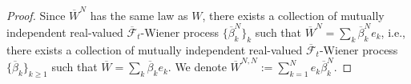 \documentclass[reqno]{amsart}
\theoremstyle{definition}
\theoremstyle{remark}
\numberwithin{equation}{section} \allowdisplaybreaks
\begin{document}
\begin{proof}
Since $\overline{W}^N$ has the same law as $W$, there exists a
collection of mutually independent real-valued
$\overline{\mathscr{F}}_t$-Wiener process
$\{\overline{\beta}_k^N\}_{k}$ such that $\overline{W}^N=\sum_k
\overline{\beta}_k^Ne_k$, i.e., there exists a collection of
mutually independent real-valued $\overline{\mathscr{F}}_t$-Wiener
process $\{\overline{\beta}_k\}_{k\geq1}$ such that
$\overline{W}=\sum_k \overline{\beta}_ke_k$. We denote
$\overline{W}^{N,N}\!\!:=\sum_{k=1}^N e_k\overline{\beta}_k^N.$

\end{proof}
\end{document}
